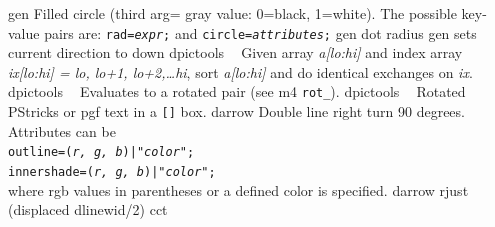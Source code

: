 %
  {gen}%
  {Filled circle (third arg= gray value: 0=black, 1=white). The possible
   key-value pairs are:
    {\tt rad={\sl expr};} and
    {\tt circle={\sl attributes};} }%
%
  {gen}%
  {dot radius}%
%
  {gen}%
  {sets current direction to down }%
%
  {dpictools}%
  {$\;\;$ Given array {\sl a[lo:hi]} and index array {\sl ix[lo:hi] =
    lo, lo+1, lo+2,\ldots hi}, sort {\sl a[lo:hi]} and do identical exchanges
    on {\sl ix}.}%
%
  {dpictools}%
  {$\;\;$ Evaluates to a rotated pair (see m4 {\tt rot\_}).}%
%
  {dpictools}%
  {$\;\;$ Rotated PStricks or pgf text in a {\tt []} box.}%
%
  {darrow}%
  {Double line right turn 90 degrees.  Attributes can be\\
    {\tt outline=({\sl r, g, b})|"{\sl color}";}\\
    {\tt innershade=({\sl r, g, b})|"{\sl color}";}\\
    where rgb values in parentheses or a defined color is specified.}%
%
  {darrow}%
  {rjust (displaced dlinewid/2)}%
%
  {cct}%
